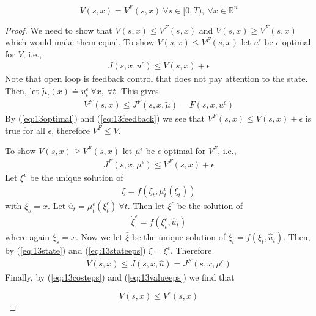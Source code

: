 \begin{proposition}%
\label{prop:13value}

\begin{equation*}
V(s,x) = V^F(s,x)~\forall s\in[0,T),~\forall x\in\mathbb{R}^n%
\end{equation*}

\end{proposition}

\begin{proof}
We need to show that $V(s,x)\leq V^F(s,x)$ and $V(s,x)\geq V^F(s,x)$ which would make them equal.
  To show $V(s,x)\leq V^F(s,x)$ let $u^\epsilon$  be $\epsilon$-optimal for $V$, i.e.,
\begin{align}
\label{eq:13optimal}
J(s,x,u^\epsilon) \leq V(s,x) + \epsilon
\end{align}
Note that open loop is feedback control that does not pay attention to the state.
Then, let $\tilde{\mu}_t(x) \doteq u_t^\epsilon~\forall x,~\forall t$.
This gives
\begin{align}
\label{eq:13feedback}
V^F(s,x) \leq J^F(s,x,\tilde{\mu}) = F(s,x,u^\epsilon)
\end{align}
By (\ref{eq:13optimal}) and (\ref{eq:13feedback}) we see that $V^F(s,x)\leq V(s,x)+\epsilon$ is true for all $\epsilon$, therefore $V^F\leq V$.

To show $V(s,x)\geq V^F(s,x)$ let $\mu^\epsilon$ be $\epsilon$-optimal for $V^F$, i.e.,
\begin{align}
\label{eq:13costeps}
J^F(s,x,\mu^\epsilon)\leq V^F(s,x) + \epsilon
\end{align}
Let $\xi^\epsilon$ be the unique solution of
\begin{align}
\label{eq:13state}
\dot{\xi}=f(\xi_t,\mu_t^\epsilon(\xi_t))
\end{align}
with $\xi_s=x$.
Let $\hat{u}_t=\mu_t^\epsilon(\xi_t^\epsilon)~\forall t$.
Then let $\xi^\epsilon$ be the solution of
\begin{align}
\label{eq:13stateeps}
\dot{\xi}^\epsilon = f(\xi_t^\epsilon,\hat{u}_t)
\end{align}
where again $\xi_s=x$.
Now we let $\bar{\xi}$ be the unique solution of $\dot{\xi}_t=f(\xi_t,\hat{u}_t)$.
Then, by (\ref{eq:13state}) and (\ref{eq:13stateeps}) $\bar{\xi}=\xi^\epsilon$.
Therefore
\begin{align}
\label{eq:13valueeps}
V(s,x) \leq J(s,x,\hat{u}) = J^F(s,x,\mu^\epsilon)
\end{align}
Finally, by (\ref{eq:13costeps}) and (\ref{eq:13valueeps}) we find that

\begin{equation*}
V(s,x) \leq V^\epsilon(s,x)
\end{equation*}

\end{proof}

